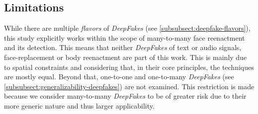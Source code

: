 \subsection{Limitations}\label{subsect:limitations}
While there are multiple \textit{flavors} of \textit{DeepFakes} (see \cref{subsubsect:deepfake-flavors}),
this study explicitly works within the scope of many-to-many face reenactment and its
detection. This means that neither \textit{DeepFakes} of text or audio signals,
face-replacement or body reenactment are part of this work. This is mainly
due to spatial constraints and considering that, in their core principles, the
techniques are mostly equal. Beyond that, one-to-one and one-to-many
\textit{DeepFakes} (see \cref{subsubsect:generalizability-deepfakes}) are not
examined. This restriction is made because we consider many-to-many \textit{DeepFakes}
to be of greater risk due to their more generic nature and thus larger applicability.
